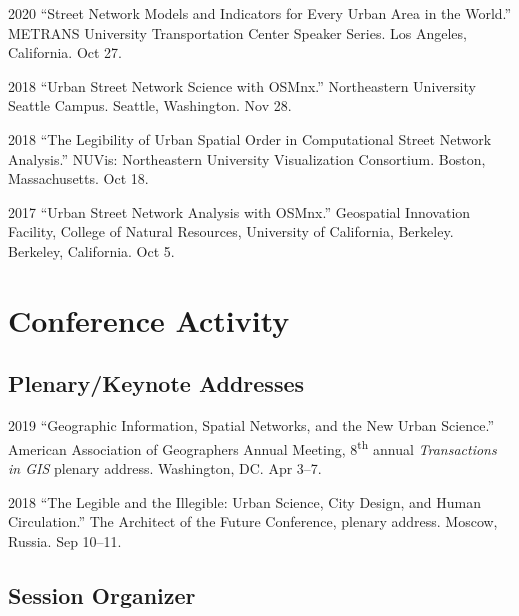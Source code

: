 \documentclass[12pt,letterpaper]{report}
\begin{document}
    \begin{tablist}

        \item[2020] \tab \enquote{Street Network Models and Indicators for Every Urban Area in the World.} METRANS University Transportation Center Speaker Series. Los Angeles, California. Oct 27.

        \item[2018] \tab \enquote{Urban Street Network Science with OSMnx.} Northeastern University Seattle Campus. Seattle, Washington. Nov 28.

        \item[2018] \tab \enquote{The Legibility of Urban Spatial Order in Computational Street Network Analysis.} NUVis: Northeastern University Visualization Consortium. Boston, Massachusetts. Oct 18.

        \item[2017] \tab \enquote{Urban Street Network Analysis with OSMnx.} Geospatial Innovation Facility, College of Natural Resources, University of California, Berkeley. Berkeley, California. Oct 5.

    \end{tablist}


    \section*{Conference Activity}

    \subsection*{Plenary/Keynote Addresses}

    \begin{tablist}

        \item[2019] \tab \enquote{Geographic Information, Spatial Networks, and the New Urban Science.} American Association of Geographers Annual Meeting, 8\textsuperscript{th} annual \textit{Transactions in GIS} plenary address. Washington, DC. Apr 3--7.

        \item[2018] \tab \enquote{The Legible and the Illegible: Urban Science, City Design, and Human Circulation.} The Architect of the Future Conference, plenary address. Moscow, Russia. Sep 10--11.

    \end{tablist}

    \subsection*{Session Organizer}
\end{document}
